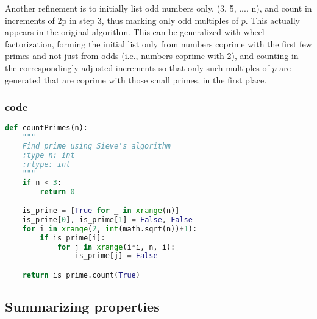 Another refinement is to initially list odd numbers only, (3, 5, ..., n), and count in increments of 2p in step 3, thus marking only odd multiples of $p$. This actually appears in the original algorithm. This can be generalized with wheel factorization, forming the initial list only from numbers coprime with the first few primes and not just from odds (i.e., numbers coprime with 2), and counting in the correspondingly adjusted increments so that only such multiples of $p$ are generated that are coprime with those small primes, in the first place.
\subsubsection{code}
\begin{lstlisting}[language=Python]
def countPrimes(n):
    """
    Find prime using Sieve's algorithm
    :type n: int
    :rtype: int
    """
    if n < 3:
        return 0

    is_prime = [True for _ in xrange(n)]
    is_prime[0], is_prime[1] = False, False
    for i in xrange(2, int(math.sqrt(n))+1):
        if is_prime[i]:
            for j in xrange(i*i, n, i):
                is_prime[j] = False

    return is_prime.count(True)
\end{lstlisting}

\subsection{Summarizing properties}


